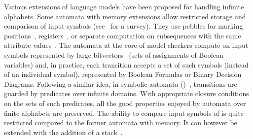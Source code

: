 %
%
Various extensions of language models have been proposed for handling infinite alphabets.
Some automata 
with memory extensions
allow restricted storage and comparison of input symbols
(see~\cite{Segoufin06csl} for a survey).
They use pebbles for marking positions~\cite{NevenSchwentickVianu04FSMinfinite},
registers~\cite{KaminskiFrancez94},
or %
separate computation on subsequences
with the same attribute values~\cite{Bojanczyk11FO2}. %
%
%
The automata at the core of model checkers
compute on input symbols represented by large bitvectors~\cite{Vardi07ciaa} %
(sets of assignments of Boolean variables) %
and, in practice,  %
each transition accepts a set of such symbols (instead of an individual symbol),
represented by Boolean Formulas or Binary Decision Diagrams.
%
Following a similar idea, %
in symbolic automata (\SA)~\cite{Veanes12symbolic,dAntoniVeanes17CAV,dAntoni21CACM},
transitions are guarded by predicates over infinite  domains.
With appropriate closure conditions on the sets of such predicates, %
all the good properties enjoyed by automata over finite alphabets are preserved.
The ability to compare input symbols of \SA is quite restricted compared to the 
former automata with memory. 
It can however be extended with the addition of a stack~\cite{dAntonyAlur14SVPDA}.

